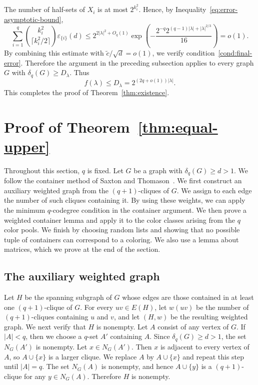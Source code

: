 \documentclass[12pt]{article}
\numberwithin{equation}{section}
\theoremstyle{definition}
\begin{document}
The number of half-sets of $X_i$ is at most $2^{k_i^2}$. Hence, by
Inequality~\eqref{eq:error-asymptotic-bound},
\[ 
 \sum_{i=1}^q
 \binom{k_i^2}{\lceil k_i^2/2\rceil}\varepsilon_{\{i\}}(d) \leq2^{2|\lambda|^2+O_q(1)}
 \exp\left(
 -\frac{2^{-q}2^{(q-1)|\lambda|+|\lambda|^{2/3}}}{16}
 \right) =o(1). 
\]
By combining this estimate with $\widetilde c/\sqrt d=o(1)$, we verify
condition~\ref{cond:final-error}.
Therefore the argument in the preceding subsection applies to every graph
$G$ with $\delta_q(G)\geq D_\lambda$. Thus
\[
 f(\lambda)\leq D_\lambda
 =2^{(2q+o(1))|\lambda|}.
\]
This completes the proof of Theorem~\ref{thm:existence}.

\section{\texorpdfstring{\thinspace}{}Proof of
Theorem~\ref{thm:equal-upper}}\label{sec:partition}

Throughout this section, $q$ is fixed. Let $G$ be a graph with
$\delta_q(G)\geq d>1$. We follow the container method of
Saxton and Thomason~\cite{ST2015}. We first construct an auxiliary weighted
graph from the $(q+1)$-cliques of $G$. We assign to each edge the number of
such cliques containing it. By using these weights, we can apply the minimum
$q$-codegree condition in the container argument. We then prove a weighted
container lemma and apply it to the color classes arising from the $q$ color
pools. We finish by choosing random lists and showing that no possible tuple
of containers can correspond to a coloring. We also use a lemma about
matrices, which we prove at the end of the section.


\subsection{The auxiliary weighted graph}\label{subsec:weighted-cliques}

Let $H$ be the spanning subgraph of $G$ whose edges are those contained in at
least one $(q+1)$-clique of $G$. For every $uv\in E(H)$, let $w(uv)$ be the
number of $(q+1)$-cliques containing $u$ and $v$, and let $(H,w)$ be the
resulting weighted graph. We next verify that $H$ is nonempty. Let $A$ consist
of any vertex of $G$. If $|A|<q$, then we choose a $q$-set $A'$ containing $A$. Since
$\delta_q(G)\geq d>1$, the set $N_G(A')$ is nonempty. Let $x\in N_G(A')$.
Then $x$ is adjacent to every vertex of $A$, so $A\cup\{x\}$ is a larger
clique. We replace $A$ by $A\cup\{x\}$ and repeat this step until $|A|=q$.
The set $N_G(A)$ is nonempty, and hence $A\cup\{y\}$ is a $(q+1)$-clique for
any $y\in N_G(A)$. Therefore $H$ is nonempty.
\end{document}
